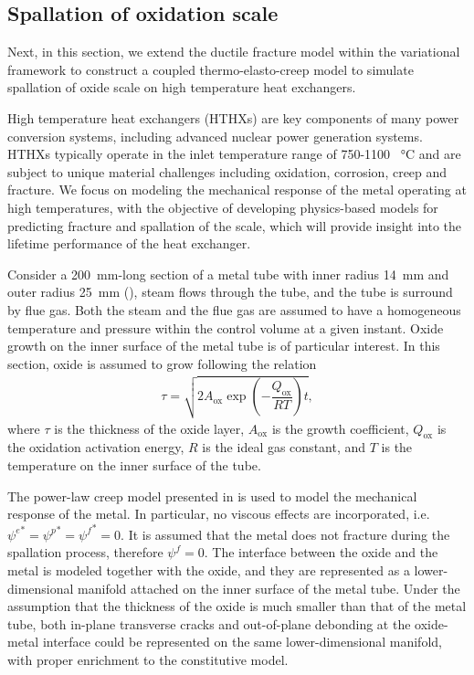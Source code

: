 \subsection{Spallation of oxidation scale}

Next, in this section, we extend the ductile fracture model within the variational framework to construct a coupled thermo-elasto-creep model to simulate spallation of oxide scale on high temperature heat exchangers.

High temperature heat exchangers (HTHXs) are key components of many power conversion systems, including advanced nuclear power generation systems. HTHXs typically operate in the inlet temperature range of 750-1100 \SI{}{\celsius} and are subject to unique material challenges including oxidation, corrosion, creep and fracture.  We focus on modeling the mechanical response of the metal operating at high temperatures, with the objective of developing physics-based models for predicting fracture and spallation of the scale, which will provide insight into the lifetime performance of the heat exchanger.



Consider a \SI{200}{\milli\meter}-long section of a metal tube with inner radius \SI{14}{\milli\meter} and outer radius \SI{25}{\milli\meter} (), steam flows through the tube, and the tube is surround by flue gas. Both the steam and the flue gas are assumed to have a homogeneous temperature and pressure within the control volume at a given instant. Oxide growth on the inner surface of the metal tube is of particular interest. In this section, oxide is assumed to grow following the relation
\begin{align}
  \tau = \sqrt{2A_\text{ox}\exp\left( -\dfrac{Q_\text{ox}}{RT} \right) t},
\end{align}
where $\tau$ is the thickness of the oxide layer, $A_\text{ox}$ is the growth coefficient, $Q_\text{ox}$ is the oxidation activation energy, $R$ is the ideal gas constant, and $T$ is the temperature on the inner surface of the tube.

The power-law creep model presented in  is used to model the mechanical response of the metal. In particular, no viscous effects are incorporated, i.e. ${\psi^e}^* = {\psi^p}^* = {\psi^f}^* = 0$. It is assumed that the metal does not fracture during the spallation process, therefore $\psi^f = 0$. The interface between the oxide and the metal is modeled together with the oxide, and they are represented as a lower-dimensional manifold attached on the inner surface of the metal tube. Under the assumption that the thickness of the oxide is much smaller than that of the metal tube, both in-plane transverse cracks and out-of-plane debonding at the oxide-metal interface could be represented on the same lower-dimensional manifold, with proper enrichment to the constitutive model.


